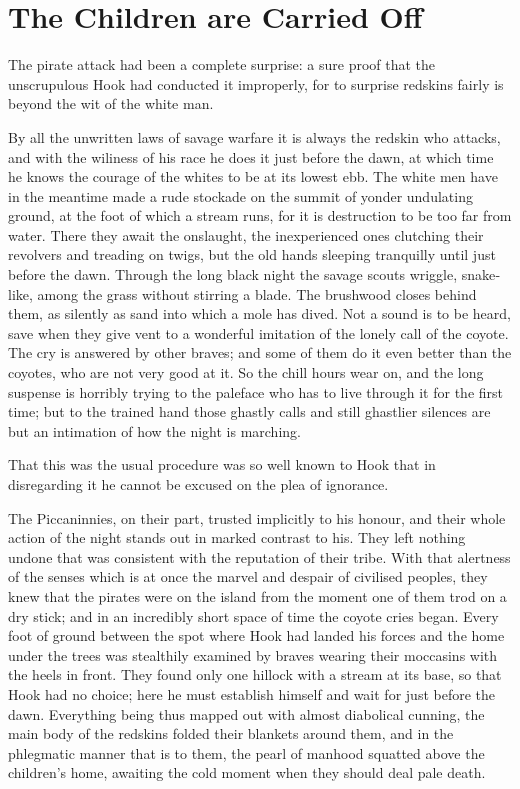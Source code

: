 
\chapter{The Children are Carried Off}

The pirate attack had been a complete surprise:
a sure proof that the unscrupulous Hook had conducted it improperly,
for to surprise redskins fairly is beyond the wit of the white man.

By all the unwritten laws of savage warfare it is always the redskin who attacks,
and with the wiliness of his race he does it just before the dawn,
at which time he knows the courage of the whites to be at its lowest ebb.
The white men have in the meantime made a rude stockade on the summit of yonder undulating ground,
at the foot of which a stream runs, for it is destruction to be too far from water.
There they await the onslaught,
the inexperienced ones clutching their revolvers and treading on twigs,
but the old hands sleeping tranquilly until just before the dawn.
Through the long black night the savage scouts wriggle, snake‐like, among the grass without stirring a blade.
The brushwood closes behind them, as silently as sand into which a mole has dived.
Not a sound is to be heard, save when they give vent to a wonderful imitation of the lonely call of the coyote.
The cry is answered by other braves;
and some of them do it even better than the coyotes, who are not very good at it.
So the chill hours wear on,
and the long suspense is horribly trying to the paleface who has to live through it for the first time;
but to the trained hand those ghastly calls and still ghastlier silences
are but an intimation of how the night is marching.

That this was the usual procedure was so well known to Hook
that in disregarding it he cannot be excused on the plea of ignorance.

The Piccaninnies, on their part, trusted implicitly to his honour,
and their whole action of the night stands out in marked contrast to his.
They left nothing undone that was consistent with the reputation of their tribe.
With that alertness of the senses which is at once the marvel and despair of civilised peoples,
they knew that the pirates were on the island from the moment one of them trod on a dry stick;
and in an incredibly short space of time the coyote cries began.
Every foot of ground between the spot where Hook had landed his forces and the home under the trees
was stealthily examined by braves wearing their moccasins with the heels in front.
They found only one hillock with a stream at its base, so that Hook had no choice;
here he must establish himself and wait for just before the dawn.
Everything being thus mapped out with almost diabolical cunning,
the main body of the redskins folded their blankets around them,
and in the phlegmatic manner that is to them, the pearl of manhood squatted above the children’s home,
awaiting the cold moment when they should deal pale death.

